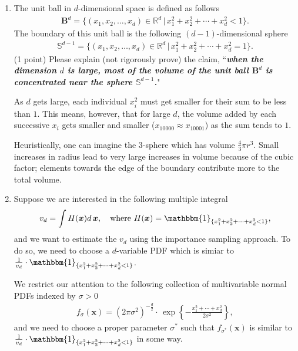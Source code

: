 \documentclass[11pt,letterpaper, leqno]{article}
\numberwithin{equation}{section}
\numberwithin{theorem}{section}
\numberwithin{lemma}{section}
\numberwithin{corollary}{section}
\numberwithin{definition}{section}
\numberwithin{proposition}{section}
\numberwithin{remark}{section}
\numberwithin{example}{section}
\begin{document}
\begin{enumerate}
    \item The unit ball in $d$-dimensional space is defined as follows
        \begin{align*}
            \mathbf{B}^d=\Big\{(x_1,x_2,\ldots,x_d)\in\mathbb{R}^d \,\Big\vert\, x_1^2+x_2^2+\cdots+x_d^2< 1 \Big\}.
        \end{align*}
        The boundary of this unit ball is the following $(d-1)$-dimensional sphere
        \begin{align*}
            \mathbb{S}^{d-1}=\Big\{(x_1,x_2,\ldots,x_d)\in\mathbb{R}^d \,\Big\vert\, x_1^2+x_2^2+\cdots+x_d^2 = 1 \Big\}.
        \end{align*}
        (1 point) Please explain (not rigorously prove) the claim, ``\textbf{\textit{when the dimension $d$ is large, most of the volume of the unit ball $\mathbf{B}^d$ is concentrated near the sphere $\mathbb{S}^{d-1}$.}}"
    
        \color{blue}
            As $d$ gets large, each individual $x_i^2$ must get smaller for their sum to be less than $1$. This means, however, that for large $d$, the volume added by each successive $x_i$ gets smaller and smaller ($x_{10000} \approx x_{10001}$) as the sum tends to $1$. 

            Heuristically, one can imagine the $3$-sphere which has volume $\frac{4}{3}\pi r^3$. Small increases in radius lead to very large increases in volume because of the cubic factor; elements towards the edge of the boundary contribute more to the total volume. 
        \color{black}

    \pagebreak
    \item Suppose we are interested in the following multiple integral
        \begin{align*}
            v_d=\int H(\boldsymbol{x}) d \,\boldsymbol{x}, \ \ \mbox{ where }H(\boldsymbol{x})=\mathbbm{1}_{\{x_1^2+x_2^2+\cdots+x_d^2< 1\}},
        \end{align*}
        and we want to estimate the $v_d$ using the importance sampling approach. To do so, we need to choose a $d$-variable PDF which is simiar to $\frac{1}{v_d}\cdot \mathbbm{1}_{\{x_1^2+x_2^2+\cdots+x_d^2< 1\}}$.
        
        We restrict our attention to the following collection of multivariable normal PDFs indexed by $\sigma>0$
        \begin{align*}
            f_\sigma(\boldsymbol{x})=(2\pi\sigma^2)^{-\frac{d}{2}} \cdot\, \exp\left\{-\frac{x_1^2+\cdots+x_d^2}{2\sigma^2}\right\},
        \end{align*}
        and we need to choose a proper parameter $\sigma^*$ such that $f_{\sigma^*}(\boldsymbol{x})$ is similar to $\frac{1}{v_d}\cdot \mathbbm{1}_{\{x_1^2+x_2^2+\cdots+x_d^2< 1\}}$ in some way.
        

\end{enumerate}
\end{document}
